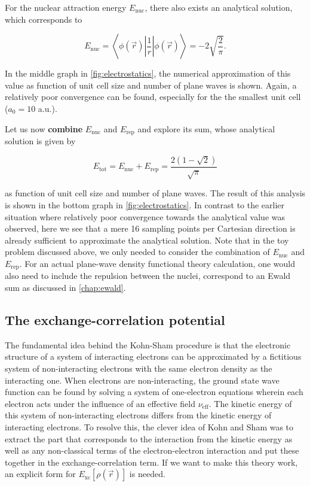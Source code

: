 For the nuclear attraction energy $E_{\text{nuc}}$, there also exists an analytical solution, which corresponds to

\begin{equation}
    E_{\text{nuc}} = \left<\phi(\vec{r})\left|\frac{1}{r}\right|\phi(\vec{r})\right> = -2\sqrt{\frac{2}{\pi}}.
\end{equation}

In the middle graph in \cref{fig:electrostatics}, the numerical approximation of this value as function of unit cell size and number of plane waves is shown. Again, a relatively poor convergence can be found, especially for the the smallest unit cell ($a_{0} = 10$ a.u.).

Let us now \textbf{combine} $E_{\text{nuc}}$ and $E_{\text{rep}}$ and explore its sum, whose analytical solution is given by

\begin{equation}
    E_{\text{tot}} = E_{\text{nuc}} + E_{\text{rep}} = \frac{2 \left( 1 - \sqrt{2} \right)}{\sqrt{\pi}}
\end{equation}

as function of unit cell size and number of plane waves. The result of this analysis is shown in the bottom graph in \cref{fig:electrostatics}. In contrast to the earlier situation where relatively poor convergence towards the analytical value was observed, here we see that a mere 16 sampling points per Cartesian direction is already sufficient to approximate the analytical solution.
Note that in the toy problem discussed above, we only needed to consider the combination of $E_{\text{nuc}}$ and $E_{\text{rep}}$. For an actual plane-wave density functional theory calculation, one would also need to include the repulsion between the nuclei, correspond to an Ewald sum as discussed in \cref{chap:ewald}.

%
%
%
\subsection{The exchange-correlation potential}

The fundamental idea behind the Kohn-Sham procedure is that the electronic structure of a system of interacting electrons can be approximated by a fictitious system of non-interacting electrons with the same electron density as the interacting one.\cite{1965:kohn} When electrons are non-interacting, the ground state wave function can be found by solving a system of one-electron equations wherein each electron acts under the influence of an effective field $\nu_{\text{eff}}$. The kinetic energy of this system of non-interacting electrons differs from the kinetic energy of interacting electrons. To resolve this, the clever idea of Kohn and Sham was to extract the part that corresponds to the interaction from the kinetic energy as well as any non-classical terms of the electron-electron interaction and put these together in the exchange-correlation term. If we want to make this theory work, an explicit form for $E_{\textrm{xc}}[\rho(\vec{r})]$ is needed.


